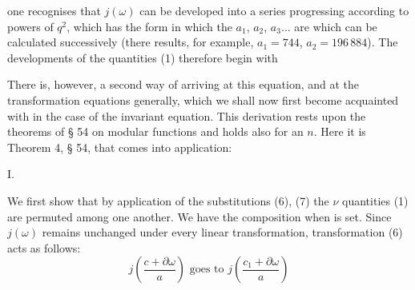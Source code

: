 one recognises that $j(\omega)$ can be developed into a series
progressing according to powers of $q^2$, which has the form
in which the $a_1$, $a_2$, $a_3 \ldots$ are  which
can be calculated successively (there results, for example, $a_1 = 744$,
$a_2 = 196\,884$). The developments of the quantities (1) therefore
begin with

There is, however, a second way of arriving at this equation, and at
the transformation equations generally, which we shall now first
become acquainted with in the case of the invariant equation.
This derivation rests upon the theorems of § 54 on modular functions
and holds also for an  $n$. Here it is
Theorem 4, § 54, that comes into application:

I. 

We first show that by application of the substitutions
(6), (7) the $\nu$ quantities (1) are permuted among one another.
We have the composition
when
is set. Since $j(\omega)$ remains unchanged under every linear
transformation, transformation (6) acts as follows:
\[
j\left(\frac{c+\partial\omega}{a}\right) \text{ goes to } j\left(\frac{c_1+\partial\omega}{a}\right)
\]

